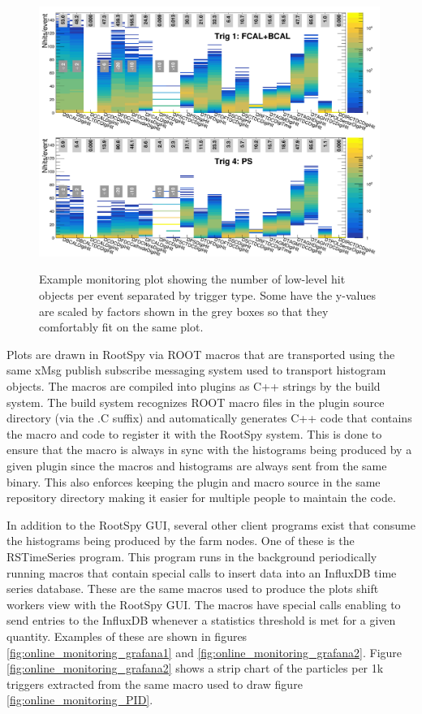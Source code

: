 \begin{figure}[tbp]
\begin{center}
\includegraphics[width=0.99\textwidth]{figures/online_monitoring_digihits.png}
\label{fig:online_monitoring_digihits}
\caption{Example monitoring plot showing the number of low-level hit objects per event separated by trigger type. Some have the y-values are scaled by factors shown in the grey boxes so that they comfortably fit on the same plot.}   
\end{center}  
\end{figure}

Plots are drawn in RootSpy via ROOT macros that are transported using the same xMsg\cite{xmsg} publish subscribe messaging system used to transport histogram objects. The macros are compiled into plugins as C++ strings by the build system. The build system recognizes ROOT macro files in the plugin source directory (via the .C suffix) and automatically generates C++ code that contains the macro and code to register it with the RootSpy system. This is done to ensure that the macro is always in sync with the histograms being produced by a given plugin since the macros and histograms are always sent from the same binary. This also enforces keeping the plugin and macro source in the same repository directory making it easier for multiple people to maintain the code.

In addition to the RootSpy GUI, several other client programs exist that consume the histograms being produced by the farm nodes. One of these is the RSTimeSeries program. This program runs in the background periodically running macros that contain special calls to insert data into an InfluxDB time series database. These are the same macros used to produce the plots shift workers view with the RootSpy GUI. The macros have special calls enabling to send entries to the InfluxDB whenever a statistics threshold is met for a given quantity. Examples of these are shown in figures \ref{fig:online_monitoring_grafana1} and \ref{fig:online_monitoring_grafana2}. Figure \ref{fig:online_monitoring_grafana2} shows a strip chart of the particles per 1k triggers extracted from the same macro used to draw figure \ref{fig:online_monitoring_PID}.

